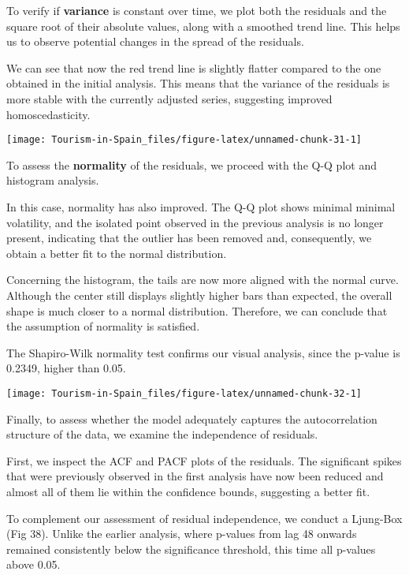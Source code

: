 \documentclass[
]{article}
\begin{document}
To verify if \textbf{variance} is constant over time, we plot both the
residuals and the square root of their absolute values, along with a
smoothed trend line. This helps us to observe potential changes in the
spread of the residuals.

We can see that now the red trend line is slightly flatter compared to
the one obtained in the initial analysis. This means that the variance
of the residuals is more stable with the currently adjusted series,
suggesting improved homoscedasticity.

\begin{center}\texttt{[image: Tourism-in-Spain\_files/figure-latex/unnamed-chunk-31-1]} \end{center}

To assess the \textbf{normality} of the residuals, we proceed with the
Q-Q plot and histogram analysis.

In this case, normality has also improved. The Q-Q plot shows minimal
minimal volatility, and the isolated point observed in the previous
analysis is no longer present, indicating that the outlier has been
removed and, consequently, we obtain a better fit to the normal
distribution.

Concerning the histogram, the tails are now more aligned with the normal
curve. Although the center still displays slightly higher bars than
expected, the overall shape is much closer to a normal distribution.
Therefore, we can conclude that the assumption of normality is
satisfied.

The Shapiro-Wilk normality test confirms our visual analysis, since the
p-value is 0.2349, higher than 0.05.

\begin{center}\texttt{[image: Tourism-in-Spain\_files/figure-latex/unnamed-chunk-32-1]} \end{center}

Finally, to assess whether the model adequately captures the
autocorrelation structure of the data, we examine the independence of
residuals.

First, we inspect the ACF and PACF plots of the residuals. The
significant spikes that were previously observed in the first analysis
have now been reduced and almost all of them lie within the confidence
bounds, suggesting a better fit.

To complement our assessment of residual independence, we conduct a
Ljung-Box (Fig 38). Unlike the earlier analysis, where p-values from lag
48 onwards remained consistently below the significance threshold, this
time all p-values above 0.05.
\end{document}
